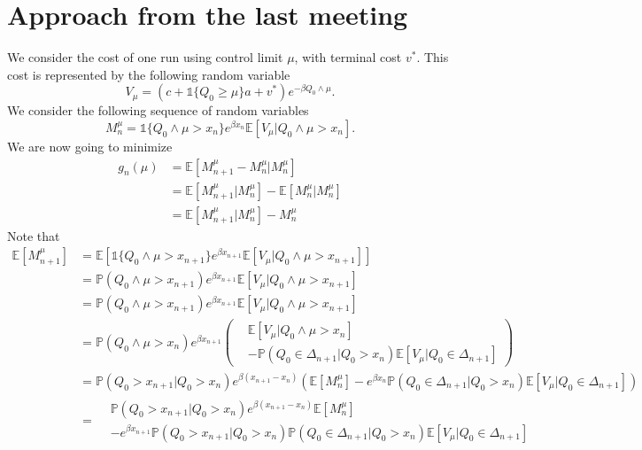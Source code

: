 \section{Approach from the last meeting}
We consider the cost of one run using control limit $\mu$, with terminal cost $v^*$.
This cost is represented by the following random variable
$$
V_\mu=(c+\mathds{1}\{Q_0\geq\mu\}a+v^*)e^{-\beta Q_0\wedge\mu}.
$$
We consider the following sequence of random variables
\begin{equation}
M_n^\mu=\mathds{1}\{Q_0\wedge\mu>x_n\}e^{\beta x_n}\mathbb{E}[V_\mu|Q_0\wedge\mu>x_n].
\end{equation}
We are now going to minimize
\begin{equation}
\begin{split}
g_n(\mu)&=\mathbb{E}[M_{n+1}^\mu-M_n^\mu|M_n^\mu]\\
&=\mathbb{E}[M_{n+1}^\mu|M_n^\mu]-\mathbb{E}[M_n^\mu|M_n^\mu]\\
&=\mathbb{E}[M_{n+1}^\mu|M_n^\mu]-M_n^\mu
\end{split}
\end{equation}
Note that
\begin{equation}
\begin{split}
\mathbb{E}[M_{n+1}^\mu]&=\mathbb{E}[\mathds{1}\{Q_0\wedge\mu>x_{n+1}\}e^{\beta x_{n+1}}\mathbb{E}[V_\mu|Q_0\wedge\mu>x_{n+1}]]\\
&=\mathbb{P}(Q_0\wedge\mu>x_{n+1})e^{\beta x_{n+1}}\mathbb{E}[V_\mu|Q_0\wedge\mu>x_{n+1}]\\
&=\mathbb{P}(Q_0\wedge\mu>x_{n+1})e^{\beta x_{n+1}}\mathbb{E}[V_\mu|Q_0\wedge\mu>x_{n+1}]\\
&=\mathbb{P}(Q_0\wedge\mu>x_{n})e^{\beta x_{n+1}}\left(
\begin{split}
&\mathbb{E}[V_\mu|Q_0\wedge\mu>x_{n}]\\
&-\mathbb{P}(Q_0\in\Delta_{n+1}|Q_0>x_n)\mathbb{E}[V_\mu|Q_0\in\Delta_{n+1}]
\end{split}\right)\\
&=\mathbb{P}(Q_0>x_{n+1}|Q_0>x_n)e^{\beta(x_{n+1}-x_n)}(\mathbb{E}[M_n^\mu]-e^{\beta x_n}\mathbb{P}(Q_0\in\Delta_{n+1}|Q_0>x_n)\mathbb{E}[V_\mu|Q_0\in\Delta_{n+1}])\\
&=\begin{split}
&\mathbb{P}(Q_0>x_{n+1}|Q_0>x_n)e^{\beta(x_{n+1}-x_n)}\mathbb{E}[M_n^\mu]\\
&-e^{\beta x_{n+1}}\mathbb{P}(Q_0>x_{n+1}|Q_0>x_n)\mathbb{P}(Q_0\in\Delta_{n+1}|Q_0>x_n)\mathbb{E}[V_\mu|Q_0\in\Delta_{n+1}]
\end{split}
\end{split}
\end{equation}
